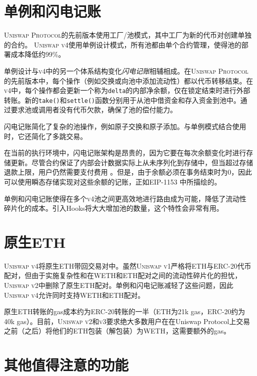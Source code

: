 \documentclass[sigconf,nonacm,prologue,table]{acmart}
\numberwithin{equation}{section}
\theoremstyle{definition}
\theoremstyle{remark}
\begin{document}
\section{单例和闪电记账} 
\label{flashaccounting}

\textsc{Uniswap Protocol}的先前版本使用工厂/池模式，其中工厂为新的代币对创建单独的合约。 \textsc{Uniswap v4}使用单例设计模式，所有池都由单个合约管理，使得池的部署成本降低约99\%。

单例设计与\textsc{v4}中的另一个体系结构变化\emph{闪电记账}相辅相成。在\textsc{Uniswap Protocol}的先前版本中，每个操作（例如交换或向池中添加流动性）都以代币转移结束。在\textsc{v4}中，每个操作都会更新一个称为\verb|delta|的内部净余额，仅在锁定结束时进行外部转账。新的\newline \verb|take()|和\verb|settle()|函数分别用于从池中借资金和存入资金到池中。通过要求池或调用者没有代币欠款，确保了池的偿付能力。

闪电记账简化了复杂的池操作，例如原子交换和原子添加。与单例模式结合使用时，它还简化了多跳交易。

在当前的执行环境中，闪电记账架构是昂贵的，因为它要在每次余额变化时进行存储更新。尽管合约保证了内部会计数据实际上从未序列化到存储中，但当超过存储退款上限，用户仍然需要支付费用 \cite{Buterin2021}。但是，由于余额必须在事务结束时为0，因此可以使用瞬态存储实现对这些余额的记账，正如EIP-1153 \cite{Akhunov2018}中所描绘的。

单例和闪电记账使得在多个\textsc{v4}池之间更高效地进行路由成为可能，降低了流动性碎片化的成本。引入Hooks将大大增加池的数量，这个特性会非常有用。

\section{原生ETH} 
\label{nativeeth}

\textsc{Uniswap v4}将原生ETH带回交易对中。虽然\textsc{Uniswap v1}严格将ETH与ERC-20代币配对，但由于实施复杂性和在WETH和ETH配对之间的流动性碎片化的担忧，\textsc{Uniswap v2}中删除了原生ETH配对。单例和闪电记账减轻了这些问题，因此\textsc{Uniswap v4}允许同时支持WETH和ETH配对。

原生ETH转账的gas成本约为ERC-20转账的一半（ETH为21k gas，ERC-20约为40k gas）。目前，\textsc{Uniswap v2}和\textsc{v3}要求绝大多数用户在在Uniswap Protocol上交易之前（之后）将他们的ETH包装（解包装）为WETH，这需要额外的gas。

\section{其他值得注意的功能} 
\label{other}
\end{document}
